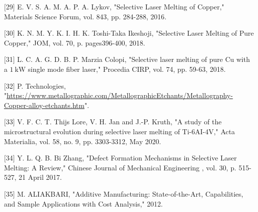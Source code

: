 \documentclass[10pt]{article}
\begin{document}
[29] E. V. S. A. M. A. P. A. Lykov, "Selective Laser Melting of Copper," Materials Science Forum, vol. 843, pp. 284-288, 2016.

[30] K. N. M. Y. K. I. H. K. Toshi-Taka Ikeshoji, "Selective Laser Melting of Pure Copper," JOM, vol. 70, p. pages396-400, 2018.

[31] L. C. A. G. D. B. P. Marzia Colopi, "Selective laser melting of pure Cu with a $1 \mathrm{~kW}$ single mode fiber laser," Procedia CIRP, vol. 74, pp. 59-63, 2018.

[32] P. Technologies, "\href{https://www.metallographic.com/MetallographicEtchants/Metallography-Copper-alloy-etchants.htm}{https://www.metallographic.com/MetallographicEtchants/Metallography-Copper-alloy-etchants.htm}".

[33] V. F. C. T. Thijs Lore, V. H. Jan and J.-P. Kruth, "A study of the microstructural evolution during selective laser melting of Ti-6AI-4V," Acta Materialia, vol. 58, no. 9, pp. 3303-3312, May 2020.

[34] Y. L. Q. B. Bi Zhang, "Defect Formation Mechanisms in Selective Laser Melting: A Review," Chinese Journal of Mechanical Engineering , vol. 30, p. 515-527, 21 April 2017.

[35] M. ALIAKBARI, "Additive Manufacturing: State-of-the-Art, Capabilities, and Sample Applications with Cost Analysis," 2012.
\end{document}
